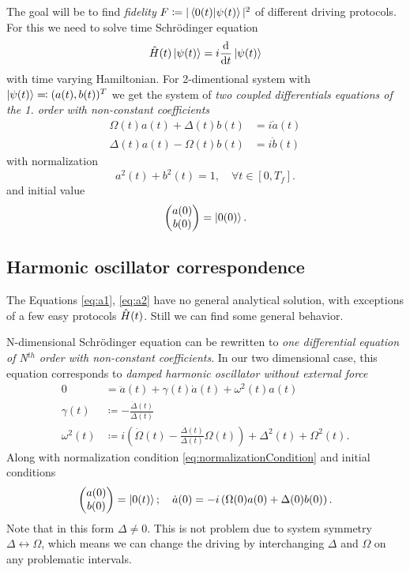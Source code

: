 The goal will be to find \emph{fidelity} $F\coloneqq |\braket{0(t)|\psi(t)}|^2$ of different driving protocols. For this we need to solve time Schr\"odinger equation
\begin{equation}
    \hat{H}(t)\ket{\psi(t)}=i\frac{\mathrm{d}}{\mathrm{d} t}\ket{\psi(t)}
\end{equation}
with time varying Hamiltonian. For 2-dimentional system with $\ket{\psi(t)}\eqqcolon (a(t),b(t))^T$ we get the system of \emph{two coupled differentials equations of the 1. order with non-constant coefficients}
\begin{align}
    \Omega(t)a(t)+\Delta(t)b(t)&=i\dot a(t)\label{eq:a1}\\
    \Delta(t)a(t)-\Omega(t)b(t)&=i\dot b(t)
    \label{eq:a2}
\end{align}
with normalization
\begin{equation}
    a^2(t)+b^2(t)=1, \quad \forall t\in [0,T_f].
    \label{eq:normalizationCondition}
\end{equation}
and initial value 
\begin{equation}
    \begin{pmatrix}
        a(0)\\b(0)
    \end{pmatrix} = \ket{0(0)}.
\end{equation}

\subsection{Harmonic oscillator correspondence}
The Equations \ref{eq:a1}, \ref{eq:a2} have no general analytical solution, with exceptions of a few easy protocols $\hat{H}(t)$. Still we can find some general behavior. 

N-dimensional Schr\"odinger equation can be rewritten to \emph{one differential equation of N$^{th}$ order with non-constant coefficients}. In our two dimensional case, this equation corresponds to \emph{damped harmonic oscillator without external force}
\begin{align}
    0&= \ddot a(t)+ \gamma(t) \dot a(t)+\omega^2(t)a(t) \label{eq:harmonicOscillator}\\
    \gamma(t)&\coloneqq -\frac{\dot \Delta(t)}{\Delta(t)} \label{eq:gammaDef}\\
    \omega^2(t) &\coloneqq i\left(\dot \Omega(t)-\frac{\dot\Delta(t)}{\Delta(t)}\Omega(t)\right)+\Delta^2(t)+\Omega^2(t).
    \label{eq:frequency}
\end{align}
Along with normalization condition \ref{eq:normalizationCondition} and initial conditions
\begin{equation}
    \begin{pmatrix}
        a(0)\\b(0)
    \end{pmatrix}=\ket{0(t)}; \quad \dot a(0)=-i\left(\Omega(0) a(0)+\Delta(0)b(0)\right).
\end{equation}
Note that in this form $\Delta\neq 0$. This is not problem due to system symmetry $\Delta\leftrightarrow \Omega$, which means we can change the driving by interchanging $\Delta$ and $\Omega$ on any problematic intervals.


